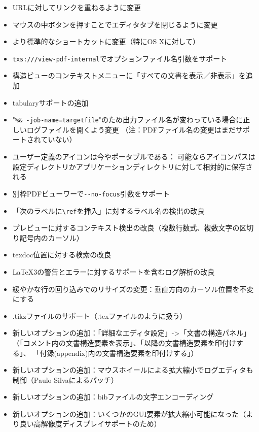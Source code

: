 \begin{itemize}
    \item
      URLに対してリンクを重ねるように変更
    \item
      マウスの中ボタンを押すことでエディタタブを閉じるように変更
    \item
      より標準的なショートカットに変更（特にOS Xに対して）
    \item
      \verb+txs:///view-pdf-internal+でオプションファイル名引数をサポート
    \item
      構造ビューのコンテキストメニューに「すべての文書を表示／非表示」を追加
    \item
      tabularyサポートの追加
    \item
      "\verb+%& -job-name=targetfile+"のため出力ファイル名が変わっている場合に正しいログファイルを開くよう変更
      （注：PDFファイル名の変更はまだサポートされていない）
    \item
      ユーザー定義のアイコンは今やポータブルである：
      可能ならアイコンパスは設定ディレクトリかアプリケーションディレクトリに対して相対的に保存される
    \item
      別枠PDFビューワーで\verb+--no-focus+引数をサポート
    \item
      「次のラベルに\verb+\ref+を挿入」に対するラベル名の検出の改良
    \item
      プレビューに対するコンテキスト検出の改良（複数行数式、複数文字の区切り記号内のカーソル）
    \item
      texdoc位置に対する検索の改良
    \item
      LaTeX3の警告とエラーに対するサポートを含むログ解析の改良
    \item
      緩やかな行の回り込みでのリサイズの変更：垂直方向のカーソル位置を不変にする
    \item
      {.tikz}ファイルのサポート（{.tex}ファイルのように扱う）
    \item
      新しいオプションの追加：「詳細なエディタ設定」-\textgreater「文書の構造パネル」
      （「コメント内の文書構造要素を表示」、「\verb++以降の文書構造要素を印付けする」、
      「付録(appendix)内の文書構造要素を印付けする」）
    \item
      新しいオプションの追加：マウスホイールによる拡大縮小でログエディタも制御（Paulo Silvaによるパッチ）
    \item
      新しいオプションの追加：bibファイルの文字エンコーディング
    \item
      新しいオプションの追加：いくつかのGUI要素が拡大縮小可能になった（より良い高解像度ディスプレイサポートのため）

\end{itemize}
